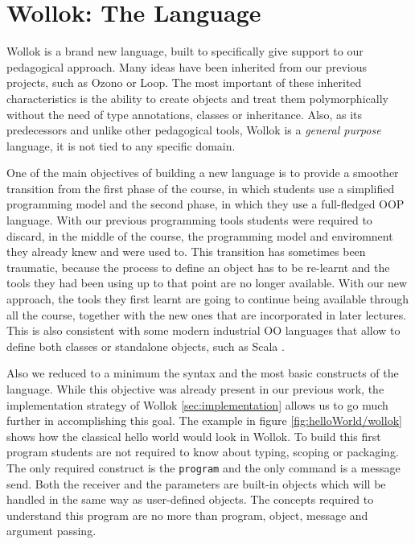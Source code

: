 \section{Wollok: The Language}
\label{sec:wollokLanguage}


Wollok is a brand new language, built to specifically give support to our pedagogical approach.
Many ideas have been inherited from our previous projects, such as Ozono or Loop. 
The most important of these inherited characteristics is the ability to create objects and treat them polymorphically without the need of type annotations, classes or inheritance.
Also, as its predecessors and unlike other pedagogical tools, Wollok is a \emph{general purpose} language, \ie it is not tied to any specific domain.

\medskip
One of the main objectives of building a new language is to provide a smoother transition from the first phase of the course,
in which students use a simplified programming model and the second phase, in which they use a full-fledged OOP language.
With our previous programming tools students were required to discard, in the middle of the course, the programming model and enviromnent they already knew and were used to.
This transition has sometimes been traumatic, because the process to define an object has to be re-learnt and the tools they had been using up to that point are no longer available.
With our new approach, the tools they first learnt are going to continue being available through all the course, together with the new ones that are incorporated in later lectures.
This is also consistent with some modern industrial OO languages that allow to define both classes or standalone objects, such as Scala \cite{Oder04a}.


\medskip
Also we reduced to a minimum the syntax and the most basic constructs of the language.
While this objective was already present in our previous work, the implementation strategy of Wollok \cf \ref{sec:implementation} allows us to go much further in accomplishing this goal.
The example in figure \ref{fig:helloWorld/wollok} shows how the classical hello world would look in Wollok.
To build this first program students are not required to know about typing, scoping or packaging.
The only required construct is the \lstinline[language=Wollok]{program} and the only command is a message send.
Both the receiver and the parameters are built-in objects which will be handled in the same way as user-defined objects.
The concepts required to understand this program are no more than program, object, message and argument passing.

